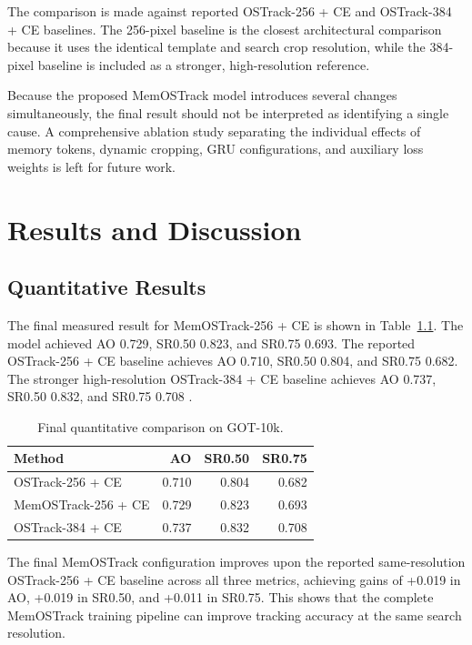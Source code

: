 \documentclass[bachelorthesis]{fer}
\numberwithin{equation}{chapter}
\begin{document}
    The comparison is made against reported OSTrack-256 + CE and OSTrack-384 + CE
    baselines. The 256-pixel baseline is the closest architectural comparison because it uses the
    identical template and search crop resolution, while the 384-pixel baseline is included as a stronger, high-resolution reference.

    Because the proposed MemOSTrack model introduces several changes simultaneously, the
    final result should not be interpreted as identifying a single cause. A comprehensive ablation study separating the individual effects of memory tokens, dynamic cropping, GRU configurations, and auxiliary loss weights is left for future work.


    \chapter{Results and Discussion}\label{results-and-discussion}


    \section{Quantitative Results}\label{quantitative-results}

    The final measured result for MemOSTrack-256 + CE is shown in Table~\ref{tab:got10k-results}. The model achieved AO 0.729, SR0.50 0.823, and SR0.75 0.693. The reported OSTrack-256 + CE baseline achieves AO 0.710, SR0.50 0.804, and SR0.75 0.682. The stronger high-resolution OSTrack-384 + CE baseline achieves AO 0.737, SR0.50 0.832, and SR0.75 0.708 \cite{ye2022ostrack}.

    \begin{longtable}[]{@{}lrrr@{}}
        \caption{Final quantitative comparison on GOT-10k.}\label{tab:got10k-results} \\
        \toprule\noalign{}
        \textbf{Method}     & \textbf{AO} & \textbf{SR0.50} & \textbf{SR0.75} \\
        \midrule\noalign{}
        \endhead
        \bottomrule\noalign{}
        \endlastfoot
        OSTrack-256 + CE    & 0.710       & 0.804           & 0.682           \\
        MemOSTrack-256 + CE & 0.729       & 0.823           & 0.693           \\
        OSTrack-384 + CE    & 0.737       & 0.832           & 0.708           \\
    \end{longtable}

    The final MemOSTrack configuration improves upon the reported same-resolution OSTrack-256 + CE baseline across all three
    metrics, achieving gains of +0.019 in AO, +0.019 in SR0.50, and +0.011 in SR0.75. This shows that the complete MemOSTrack training pipeline can improve tracking accuracy at the same search resolution.
\end{document}
